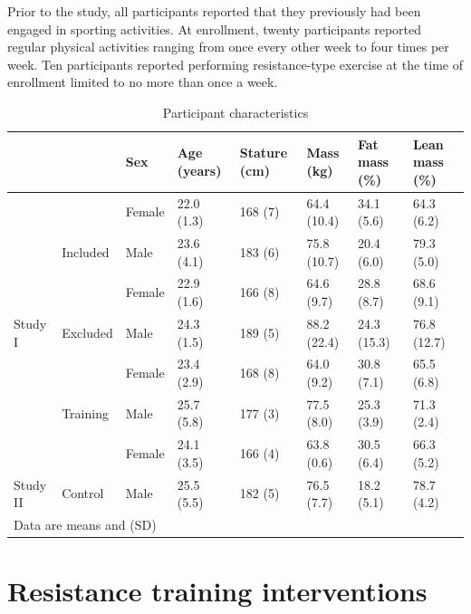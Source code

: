 \documentclass[twoside,10pt]{gihclass} %
\begin{document}
Prior to the study, all participants reported that they previously had been engaged in sporting activities. At enrollment, twenty participants reported regular physical activities ranging from once every other week to four times per week. Ten participants reported performing resistance-type exercise at the time of enrollment limited to no more than once a week.
\begin{table}

\caption{\label{tab:characteristics-table}Participant characteristics}
\centering
\fontsize{7}{9}\selectfont
\begin{tabular}[t]{llllllll}
\toprule
  &   & Sex & Age (years) & Stature
(cm) & Mass (kg) & Fat mass (\%) & Lean mass (\%)\\
\midrule
 &  & Female & 22.0 (1.3) & 168 (7) & 64.4 (10.4) & 34.1 (5.6) & 64.3 (6.2)\\
\cmidrule{3-8}
 & \multirow{-2}{*}{\raggedright\arraybackslash Included} & Male & 23.6 (4.1) & 183 (6) & 75.8 (10.7) & 20.4 (6.0) & 79.3 (5.0)\\
\cmidrule{2-8}
 &  & Female & 22.9 (1.6) & 166 (8) & 64.6 (9.7) & 28.8 (8.7) & 68.6 (9.1)\\
\cmidrule{3-8}
\multirow{-4}{*}{\raggedright\arraybackslash Study I} & \multirow{-2}{*}{\raggedright\arraybackslash Excluded} & Male & 24.3 (1.5) & 189 (5) & 88.2 (22.4) & 24.3 (15.3) & 76.8 (12.7)\\
\cmidrule{1-8}
 &  & Female & 23.4 (2.9) & 168 (8) & 64.0 (9.2) & 30.8 (7.1) & 65.5 (6.8)\\
\cmidrule{3-8}
 & \multirow{-2}{*}{\raggedright\arraybackslash Training} & Male & 25.7 (5.8) & 177 (3) & 77.5 (8.0) & 25.3 (3.9) & 71.3 (2.4)\\
\cmidrule{2-8}
 &  & Female & 24.1 (3.5) & 166 (4) & 63.8 (0.6) & 30.5 (6.4) & 66.3 (5.2)\\
\cmidrule{3-8}
\multirow{-4}{*}{\raggedright\arraybackslash Study II} & \multirow{-2}{*}{\raggedright\arraybackslash Control} & Male & 25.5 (5.5) & 182 (5) & 76.5 (7.7) & 18.2 (5.1) & 78.7 (4.2)\\
\bottomrule
\multicolumn{8}{l}{\rule{0pt}{1em}Data are means and (SD)}\\
\end{tabular}
\end{table}
\hypertarget{resistance-training-interventions}{%
\section{Resistance training interventions}\label{resistance-training-interventions}}
\end{document}
